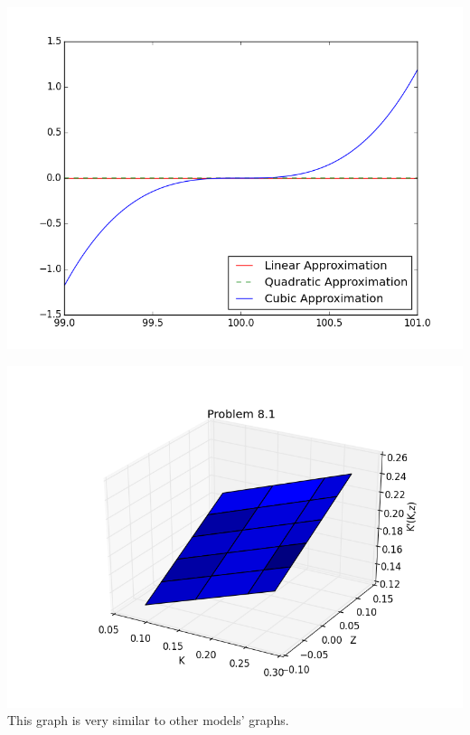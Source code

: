 \documentclass[letterpaper,12pt]{article}
\theoremstyle{definition}
\begin{document}
\includegraphics[scale = .75]{lqc}

\includegraphics[scale=.75]{figure_81.png}
This graph is very similar to other models' graphs.
\end{document}
